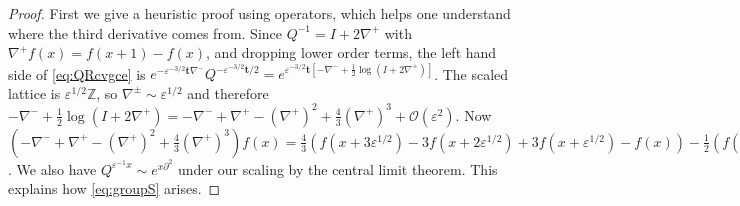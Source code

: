 \documentclass[letterpaper,reqno,11pt,oneside,final]{amsart}
\theoremstyle{definition}
\newcommand{\zz}{\mathbb{Z}}
\newcommand{\ep}{\varepsilon}
\newcommand{\ft}{\mathbf{t}}
\numberwithin{equation}{section}
\begin{document}
\begin{proof}
First we give a heuristic proof using operators, which helps one understand where the third derivative comes from.
Since $Q^{-1}=I+2\nabla^+$ with $\nabla^+f(x)=f(x+1)-f(x)$, and dropping lower order terms, the left hand side of \eqref{eq:QRcvgce} is $e^{-\ep^{-3/2}\ft\nabla^-}Q^{-\ep^{-3/2}\ft/2}= e^{\ep^{-3/2}\ft[-\nabla^- + \frac12\log(I+2\nabla^+)]}$.
The scaled lattice is $\ep^{1/2}\zz$, so $\nabla^\pm\sim \ep^{1/2}$ and therefore $-\nabla^- + \tfrac12\log(I+2\nabla^+) = -\nabla^-+\nabla^+-(\nabla^+)^2+\tfrac43(\nabla^+)^3 +\mathcal{O}(\ep^2)$.
Now $(-\nabla^-+\nabla^+-(\nabla^+)^2+\tfrac43(\nabla^+)^3)f (x) = \tfrac43( f(x+3\ep^{1/2})-3f(x+2\ep^{1/2})+3f(x+\ep^{1/2})-f(x))-\tfrac12( f(x+2\ep^{1/2})-3f(x+\ep^{1/2})+3f(x)-f(x-\ep^{1/2}))\sim \tfrac13\ep^{3/2}\partial^3 f(x)$.
We also have $Q^{\ep^{-1}x}\sim e^{x\partial^2}$ under our scaling by the central limit theorem.
This explains how \eqref{eq:groupS} arises.  


\end{proof}
\end{document}
